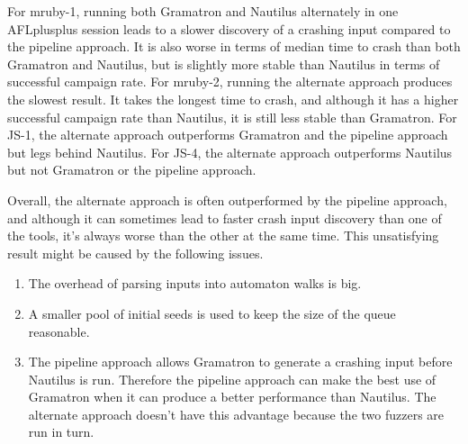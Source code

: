 For mruby-1, running both Gramatron and Nautilus alternately in one AFLplusplus session leads to a slower discovery of a crashing input compared to the pipeline approach. It is also worse in terms of median time to crash than both Gramatron and Nautilus, but is slightly more stable than Nautilus in terms of successful campaign rate. For mruby-2, running the alternate approach produces the slowest result. It takes the longest time to crash, and although it has a higher successful campaign rate than Nautilus, it is still less stable than Gramatron. For JS-1, the alternate approach outperforms Gramatron and the pipeline approach but legs behind Nautilus. For JS-4, the alternate approach outperforms Nautilus but not Gramatron or the pipeline approach.

Overall, the alternate approach is often outperformed by the pipeline approach, and although it can sometimes lead to faster crash input discovery than one of the tools, it's always worse than the other at the same time. This unsatisfying result might be caused by the following issues.
\begin{enumerate}
    \item The overhead of parsing inputs into automaton walks is big.
    \item A smaller pool of initial seeds is used to keep the size of the queue reasonable.
    \item The pipeline approach allows Gramatron to generate a crashing input before Nautilus is run. Therefore the pipeline approach can make the best use of Gramatron when it can produce a better performance than Nautilus. The alternate approach doesn't have this advantage because the two fuzzers are run in turn.
\end{enumerate}


